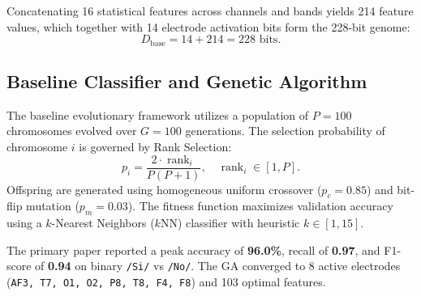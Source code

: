 \documentclass[10pt,twocolumn,a4paper]{article}
\begin{document}
Concatenating 16 statistical features across channels and bands yields 214 feature values, which together with 14 electrode activation bits form the 228-bit genome:
\begin{equation}
D_{\text{base}} = 14 + 214 = 228\text{ bits}.
\label{eq:dbase}
\end{equation}

\subsection{Baseline Classifier and Genetic Algorithm}
The baseline evolutionary framework utilizes a population of $P=100$ chromosomes evolved over $G=100$ generations. The selection probability of chromosome $i$ is governed by Rank Selection:
\begin{equation}
p_i = \frac{2 \cdot \operatorname{rank}_i}{P(P+1)}, \quad \operatorname{rank}_i \in [1, P].
\label{eq:rank}
\end{equation}
Offspring are generated using homogeneous uniform crossover ($p_c = 0.85$) and bit-flip mutation ($p_m = 0.03$). The fitness function maximizes validation accuracy using a $k$-Nearest Neighbors ($k$NN) classifier with heuristic $k \in [1, 15]$.

The primary paper reported a peak accuracy of \textbf{96.0\%}, recall of \textbf{0.97}, and F1-score of \textbf{0.94} on binary \texttt{/Si/} vs \texttt{/No/}. The GA converged to 8 active electrodes (\texttt{AF3, T7, O1, O2, P8, T8, F4, F8}) and 103 optimal features.

\end{document}
